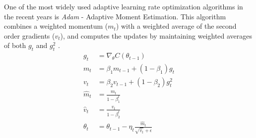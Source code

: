 
One of the most widely used adaptive learning rate optimization algorithms in the recent years is \textit{Adam} - Adaptive Moment Estimation.
This algorithm combines a weighted momentum ($m_t$) with a weighted average of the second order gradients ($v_t$), and computes the updates by maintaining weighted averages of both $g_t$ and $g_t^2$ \citep[p. 123]{Ketkar2017}.
\begin{equation}\label{eq:updt_adam}
\begin{split}
    g_t &= \nabla_{\theta}C(\theta_{t-1})   \\
    m_t &= \beta_1m_{t-1} + (1-\beta_1)g_t \\
    v_t &= \beta_2v_{t-1} + (1-\beta_2)g_t^2 \\
    \hat{m}_t &= \frac{m_t}{1-\beta_1^t} \\
    \hat{v}_t &= \frac{v_t}{1-\beta_2^t} \\
    \theta_{t} &= \theta_{t-1} - \eta_t \frac{\hat{m}_t}{\sqrt{\hat{v}_t}+\epsilon}
\end{split}
\end{equation}

